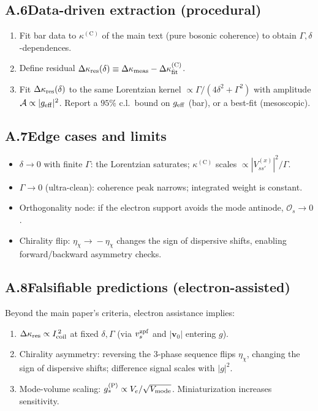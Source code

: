 \documentclass[aps,prb,preprint,amsmath,amssymb]{revtex4-2} %
\begin{document}
    \subsection*{A.6\quad Data-driven extraction (procedural)}
    \begin{enumerate}\itemsep2pt
    \item Fit bar data to \(\kappa^{(\mathrm C)}\) of the main text (pure bosonic coherence) to obtain \(\Gamma,\delta\)-dependences.
    \item Define residual \(\Delta\kappa_{\rm res}(\delta)\equiv \Delta\kappa_{\rm meas}-\Delta\kappa^{(\mathrm C)}_{\rm fit}\).
    \item Fit \(\Delta\kappa_{\rm res}(\delta)\) to the same Lorentzian kernel \(\propto \Gamma/(4\delta^2+\Gamma^2)\) with amplitude \(\mathcal A\propto |g_{\rm eff}|^2\). Report a \(95\%\) c.l.\ bound on \(g_{\rm eff}\) (bar), or a best-fit (mesoscopic).
    \end{enumerate}

    \subsection*{A.7\quad Edge cases and limits}
    \begin{itemize}\itemsep2pt
    \item \(\delta\!\to\!0\) with finite \(\Gamma\): the Lorentzian saturates; \(\kappa^{(\mathrm C)}\) scales \(\propto |V_{ss'}^{(x)}|^2/\Gamma\).
    \item \(\Gamma\!\to\!0\) (ultra-clean): coherence peak narrows; integrated weight is constant.
    \item Orthogonality node: if the electron support avoids the mode antinode, \(\mathcal O_s\!\to\!0\).
    \item Chirality flip: \(\eta_\chi\!\to\!-\eta_\chi\) changes the sign of dispersive shifts, enabling forward/backward asymmetry checks.
    \end{itemize}

    \subsection*{A.8\quad Falsifiable predictions (electron-assisted)}
    Beyond the main paper’s criteria, electron assistance implies:
    \begin{enumerate}\itemsep2pt
    \item \(\Delta\kappa_{\rm res}\propto I_{\rm coil}^{\,2}\) at fixed \(\delta,\Gamma\) (via \(v_{s}^{\rm zpf}\) and \(|\mathbf v_0|\) entering \(g\)).
    \item Chirality asymmetry: reversing the 3-phase sequence flips \(\eta_\chi\), changing the sign of dispersive shifts; difference signal scales with \(|g|^2\).
    \item Mode-volume scaling: \(g_s^{(\mathrm P)}\propto V_e/\sqrt{V_{\rm mode}}\). Miniaturization increases sensitivity.
    \end{enumerate}
\end{document}
